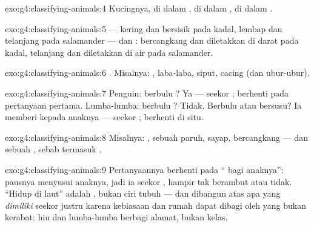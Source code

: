 \begin{solution}{exo:g4:classifying-animals:4}
Kucingnya, di dalam , di dalam , di dalam .
\end{solution}

\begin{solution}{exo:g4:classifying-animals:5}
 --- kering dan bersisik pada kadal, lembap dan telanjang pada
salamander --- dan : bercangkang dan diletakkan di darat pada
kadal, telanjang dan diletakkan di air pada salamander.
\end{solution}

\begin{solution}{exo:g4:classifying-animals:6}
. Misalnya: , laba-laba, siput, cacing (dan
ubur-ubur).
\end{solution}

\begin{solution}{exo:g4:classifying-animals:7}
Penguin: berbulu ? Ya --- seekor ; berhenti pada
pertanyaan pertama. Lumba-lumba: berbulu ? Tidak. Berbulu atau
bersusu? Ia memberi  kepada anaknya --- seekor ; berhenti
di situ.
\end{solution}

\begin{solution}{exo:g4:classifying-animals:8}
Misalnya: , sebuah paruh, sayap,  bercangkang --- dan
sebuah , sebab  termasuk .
\end{solution}

\begin{solution}{exo:g4:classifying-animals:9}
Pertanyaannya berhenti pada `` bagi anaknya'': pausnya menyusui
anaknya, jadi ia seekor , hampir tak berambut atau tidak.
``Hidup di laut'' adalah , bukan ciri tubuh --- dan 
dibangun atas apa yang \emph{dimiliki} seekor  justru karena
kebiasaan dan rumah dapat dibagi oleh yang bukan kerabat: hiu dan
lumba-lumba berbagi alamat, bukan kelas.
\end{solution}

